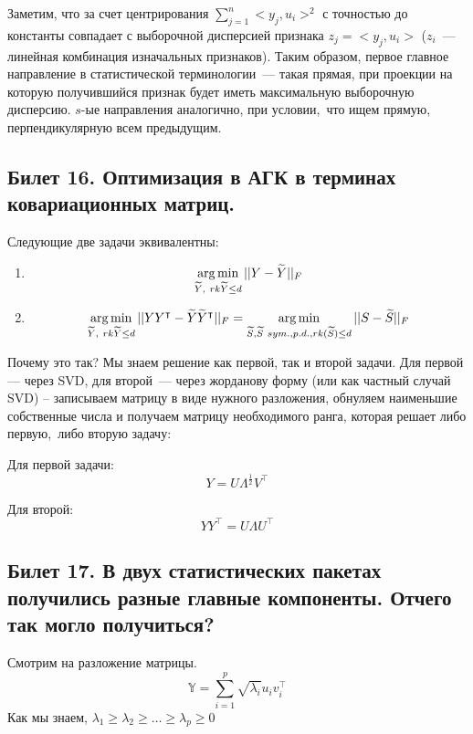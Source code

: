 Заметим, что за счет центрирования $\sum \limits_{j=1}^n <y_j, u_i>^2$ с точностью до константы совпадает с выборочной дисперсией признака $z_j = <y_j, u_i>$ ($z_i$ — линейная комбинация изначальных признаков). Таким образом, 
первое главное направление в статистической терминологии — такая прямая, при проекции на которую получившийся признак будет иметь максимальную выборочную дисперсию. 
$s$-ые направления аналогично, при условии, что ищем прямую, перпендикулярную всем предыдущим.

\subsection{Билет 16. Оптимизация в АГК в терминах ковариационных матриц.}

\begin{thm}
Следующие две задачи эквивалентны:
\begin{enumerate}
\item
$$  \argmin\limits_{\widetilde{Y}, rk\widetilde{Y} \leq d} ||Y - \widetilde{Y}||_{F} $$
\item $$\argmin\limits_{\widetilde{Y}, rk\widetilde{Y} \leq d} ||YY^{\intercal} - \widetilde{Y}\widetilde{Y}^{\intercal}||_{F} = \argmin\limits_{\widetilde{S}, \widetilde{S} sym.,p.d., rk(\widetilde{S}) \leq d} ||S - \widetilde{S}||_{F}$$
\end{enumerate}
\end{thm}

Почему это так? Мы знаем решение как первой, так и второй задачи. Для первой — через SVD, для второй — через жорданову форму (или как частный случай SVD) – записываем матрицу в виде нужного разложения, обнуляем наименьшие собственные числа и получаем матрицу необходимого ранга, которая решает либо первую, либо вторую задачу:

Для первой задачи:
$$ Y = U\Lambda^{\frac{1}{2}} V^{\intercal}$$

Для второй:
$$ YY^{\intercal} = U\Lambda U^{\intercal}$$



\subsection{Билет 17. В двух статистических пакетах получились разные главные компоненты. Отчего так могло
получиться?}
Смотрим на разложение матрицы. 
$$ \mathbb{Y} = \sum \limits_{i=1}^{p} \sqrt{\lambda_i}u_iv_i^{\intercal}$$
Как мы знаем, $\lambda_1 \geq \lambda_2\geq…\geq \lambda_p\geq0$

